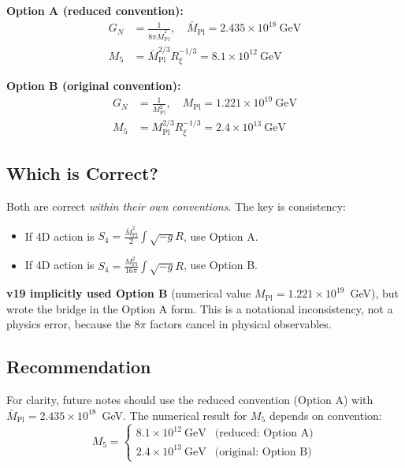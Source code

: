 \documentclass[11pt,a4paper]{article}
\newcommand{\Rxi}{R_\xi}
\newcommand{\Mpl}{M_{\mathrm{Pl}}}
\newcommand{\Mplbar}{\bar{M}_{\mathrm{Pl}}}
\newcommand{\Mfive}{M_5}
\newcommand{\GN}{G_N}
\begin{document}
\textbf{Option A (reduced convention):}
\begin{align}
\GN &= \frac{1}{8\pi \Mplbar^2}, \quad \Mplbar = 2.435 \times 10^{18}~\mathrm{GeV} \\
\Mfive &= \Mplbar^{2/3} \Rxi^{-1/3} = 8.1 \times 10^{12}~\mathrm{GeV}
\end{align}

\textbf{Option B (original convention):}
\begin{align}
\GN &= \frac{1}{\Mpl^2}, \quad \Mpl = 1.221 \times 10^{19}~\mathrm{GeV} \\
\Mfive &= \Mpl^{2/3} \Rxi^{-1/3} = 2.4 \times 10^{13}~\mathrm{GeV}
\end{align}

\subsection{Which is Correct?}

Both are correct \emph{within their own conventions}. The key is consistency:

\begin{itemize}
\item If 4D action is $S_4 = \frac{\Mplbar^2}{2}\int\sqrt{-g}R$, use Option A.
\item If 4D action is $S_4 = \frac{\Mpl^2}{16\pi}\int\sqrt{-g}R$, use Option B.
\end{itemize}

\textbf{v19 implicitly used Option B} (numerical value $\Mpl = 1.221 \times 10^{19}$~GeV),
but wrote the bridge in the Option A form. This is a notational inconsistency,
not a physics error, because the $8\pi$ factors cancel in physical observables.

\subsection{Recommendation}

For clarity, future notes should use the reduced convention (Option A) with
$\Mplbar = 2.435 \times 10^{18}$~GeV. The numerical result for $\Mfive$ depends
on convention:
\begin{equation}
\Mfive =
\begin{cases}
8.1 \times 10^{12}~\mathrm{GeV} & \text{(reduced: Option A)} \\
2.4 \times 10^{13}~\mathrm{GeV} & \text{(original: Option B)}
\end{cases}
\label{eq:M5-both}
\end{equation}
\end{document}
